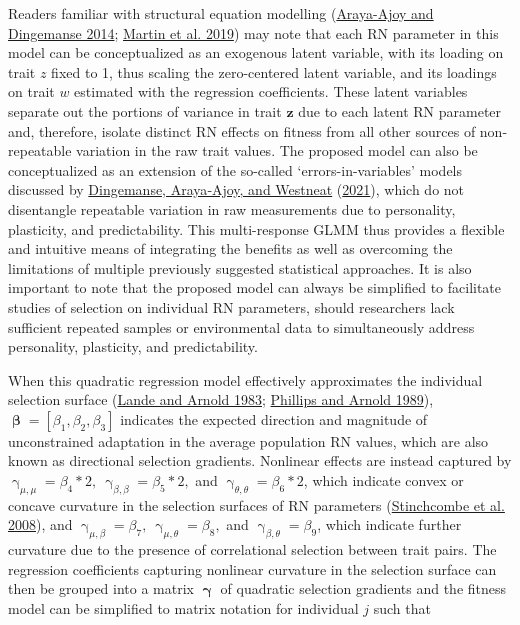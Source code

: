 \documentclass{article}
\begin{document}
Readers familiar with structural equation modelling
(\protect\hyperlink{ref-Araya2014}{Araya-Ajoy and Dingemanse 2014};
\protect\hyperlink{ref-Martin2019}{Martin et al. 2019}) may note that
each RN parameter in this model can be conceptualized as an exogenous
latent variable, with its loading on trait \(z\) fixed to 1, thus
scaling the zero-centered latent variable, and its loadings on trait
\(w\) estimated with the regression coefficients. These latent variables
separate out the portions of variance in trait \(\boldsymbol{z}\) due to
each latent RN parameter and, therefore, isolate distinct RN effects on
fitness from all other sources of non-repeatable variation in the raw
trait values. The proposed model can also be conceptualized as an
extension of the so-called `errors-in-variables' models discussed by
\protect\hyperlink{ref-Ding2021}{Dingemanse, Araya‐Ajoy, and Westneat}
(\protect\hyperlink{ref-Ding2021}{2021}), which do not disentangle
repeatable variation in raw measurements due to personality, plasticity,
and predictability. This multi-response GLMM thus provides a flexible
and intuitive means of integrating the benefits as well as overcoming
the limitations of multiple previously suggested statistical approaches.
It is also important to note that the proposed model can always be
simplified to facilitate studies of selection on individual RN
parameters, should researchers lack sufficient repeated samples or
environmental data to simultaneously address personality, plasticity,
and predictability.

When this quadratic regression model effectively approximates the
individual selection surface (\protect\hyperlink{ref-Lande1983}{Lande
and Arnold 1983}; \protect\hyperlink{ref-Phillips1989}{Phillips and
Arnold 1989}),
\(\boldsymbol{\upbeta}=\left[\beta_1,\beta_2,\beta_3 \right]\) indicates
the expected direction and magnitude of unconstrained adaptation in the
average population RN values, which are also known as directional
selection gradients. Nonlinear effects are instead captured by
\(\upgamma _{\mu,\mu}=\beta_4*2, \ \upgamma _{\beta,\beta}= \beta_5*2,\)
and \(\upgamma _{\theta,\theta}= \beta_6*2\), which indicate convex or
concave curvature in the selection surfaces of RN parameters
(\protect\hyperlink{ref-Stinch2008}{Stinchcombe et al. 2008}), and
\(\upgamma _{\mu,\beta}=\beta_7, \ \upgamma _{\mu,\theta}=\beta_8,\) and
\(\upgamma _{\beta,\theta}=\beta_9\), which indicate further curvature
due to the presence of correlational selection between trait pairs. The
regression coefficients capturing nonlinear curvature in the selection
surface can then be grouped into a matrix \(\boldsymbol{\upgamma}\) of
quadratic selection gradients and the fitness model can be simplified to
matrix notation for individual \(j\) such that
\end{document}
